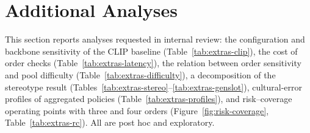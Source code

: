 \documentclass[letterpaper]{article}
\begin{document}
\FloatBarrier
\section{Additional Analyses}
\label{app:extras}
This section reports analyses requested in internal review: the configuration and backbone sensitivity of the CLIP baseline (Table~\ref{tab:extras-clip}), the cost of order checks (Table~\ref{tab:extras-latency}), the relation between order sensitivity and pool difficulty (Table~\ref{tab:extras-difficulty}), a decomposition of the stereotype result (Tables~\ref{tab:extras-stereo}--\ref{tab:extras-genslot}), cultural-error profiles of aggregated policies (Table~\ref{tab:extras-profiles}), and risk--coverage operating points with three and four orders (Figure~\ref{fig:risk-coverage}, Table~\ref{tab:extras-rc}). All are post hoc and exploratory.

\begin{table}[p]
\centering

\label{tab:extras-clip}
\vspace{1em}

\label{tab:extras-latency}
\vspace{1em}

\label{tab:extras-difficulty}
\vspace{1em}

\label{tab:extras-profiles}
\end{table}
\end{document}
